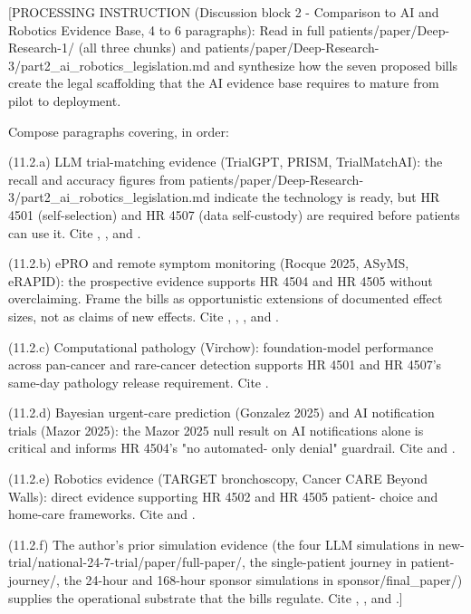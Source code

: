 [PROCESSING INSTRUCTION (Discussion block 2 - Comparison to AI and
Robotics Evidence Base, 4 to 6 paragraphs): Read in full
patients/paper/Deep-Research-1/ (all three chunks) and
patients/paper/Deep-Research-3/part2\_ai\_robotics\_legislation.md and
synthesize how the seven proposed bills create the legal scaffolding
that the AI evidence base requires to mature from pilot to deployment.

Compose paragraphs covering, in order:

(11.2.a) LLM trial-matching evidence (TrialGPT, PRISM, TrialMatchAI):
the recall and accuracy figures from
patients/paper/Deep-Research-3/part2\_ai\_robotics\_legislation.md
indicate the technology is ready, but HR 4501 (self-selection) and
HR 4507 (data self-custody) are required before patients can use it.
Cite \cite{jin2024trialgpt}, \cite{gupta2024prism}, and
\cite{abdallah2026trialmatchai}.

(11.2.b) ePRO and remote symptom monitoring (Rocque 2025, ASyMS,
eRAPID): the prospective evidence supports HR 4504 and HR 4505
without overclaiming. Frame the bills as opportunistic extensions of
documented effect sizes, not as claims of new effects. Cite
\cite{rocque2025remote_symptom_monitoring}, \cite{kearney2009asyms},
\cite{maguire2017esmart}, and \cite{absolom2021erapid}.

(11.2.c) Computational pathology (Virchow): foundation-model
performance across pan-cancer and rare-cancer detection supports HR
4501 and HR 4507's same-day pathology release requirement. Cite
\cite{vorontsov2024virchow}.

(11.2.d) Bayesian urgent-care prediction (Gonzalez 2025) and AI
notification trials (Mazor 2025): the Mazor 2025 null result on AI
notifications alone is critical and informs HR 4504's "no automated-
only denial" guardrail. Cite \cite{gonzalez2025bayesian_urgent_care_nsclc}
and \cite{mazor2025ai_notifications_trial}.

(11.2.e) Robotics evidence (TARGET bronchoscopy, Cancer CARE Beyond
Walls): direct evidence supporting HR 4502 and HR 4505 patient-
choice and home-care frameworks. Cite \cite{target2025robotic_bronchoscopy}
and \cite{dronca2026cancer_care_beyond_walls}.

(11.2.f) The author's prior simulation evidence (the four LLM
simulations in new-trial/national-24-7-trial/paper/full-paper/, the
single-patient journey in patient-journey/, the 24-hour and 168-hour
sponsor simulations in sponsor/final\_paper/) supplies the
operational substrate that the bills regulate. Cite
\cite{kawchak_2026_19994945}, \cite{kawchak_2026_19119939}, and
\cite{kawchak_2026_19396256}.]

